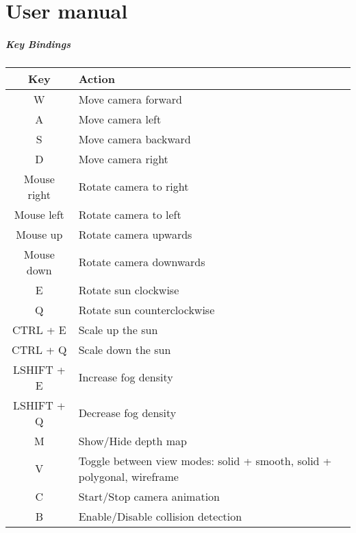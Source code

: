 \chapter{User manual}

\paragraph{Key Bindings}

\begin{center}
 \begin{tabular}{| c | l |} 
 \hline
 Key & Action \\ [0.5ex] 
 \hline\hline
 W & Move camera forward\\ 
 \hline
 A & Move camera left\\ 
 \hline
 S & Move camera backward\\ 
 \hline
 D & Move camera right\\ 
 \hline
 Mouse right & Rotate camera to right \\ 
 \hline
 Mouse left & Rotate camera to left \\ 
 \hline
 Mouse up & Rotate camera upwards \\ 
 \hline
 Mouse down & Rotate camera downwards \\ 
 \hline
 E & Rotate sun clockwise \\
 \hline
 Q & Rotate sun counterclockwise \\
 \hline
 CTRL + E & Scale up the sun \\
 \hline
 CTRL + Q & Scale down the sun \\
 \hline
 LSHIFT + E & Increase fog density \\
 \hline
 LSHIFT + Q & Decrease fog density \\
 \hline
 M & Show/Hide depth map \\
 \hline
 V & Toggle between view modes: solid + smooth, solid + polygonal, wireframe  \\
 \hline
 C & Start/Stop camera animation \\
 \hline
 B & Enable/Disable collision detection \\ [1ex] 
 \hline
\end{tabular}
\end{center}

